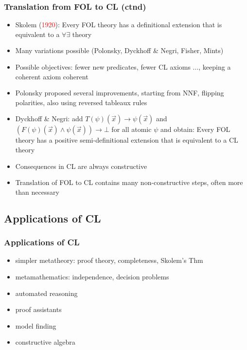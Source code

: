 \documentclass[handout,11pt]{beamer}
\newcommand{\red}[1]{\textcolor{red}{#1}}
\begin{document}
\begin{frame}
\frametitle{Translation from FOL to CL (ctnd)}
 \begin{itemize}[<+->]
   \item Skolem (\red{1920}): Every FOL theory has a definitional 
   extension that is equivalent to a $\forall\exists$ theory
   \item Many variations possible (Polonsky, Dyckhoff \& Negri, Fisher, Mints)
   \item Possible objectives: fewer new predicates, fewer CL axioms ...,
   keeping a coherent axiom coherent
   \item Polonsky proposed several improvements, starting from NNF,
   flipping polarities, also using reversed tableaux rules
   \item Dyckhoff \& Negri: add $T(\psi)(\vec{x}) \to \psi(\vec{x})$ 
   and $(F(\psi)(\vec{x})\wedge \psi(\vec{x})) \to \bot$
   for all atomic $\psi$ and obtain:
   Every FOL theory has a positive semi-definitional extension 
   that is equivalent to a CL theory
   \item Consequences in CL are always constructive
   \item Translation of FOL to CL contains many non-constructive steps,
   often more than necessary
 \end{itemize}
\end{frame}

\subsection{Applications of CL}

\begin{frame}
\frametitle{Applications of CL}
 \begin{itemize}[<+->]   %
    \item simpler metatheory: proof theory, completeness, Skolem's Thm
    \item metamathematics: independence, decision problems
    \item automated reasoning
    \item proof assistants    
    \item model finding
    \item constructive algebra
 \end{itemize}
\end{frame}
\end{document}
